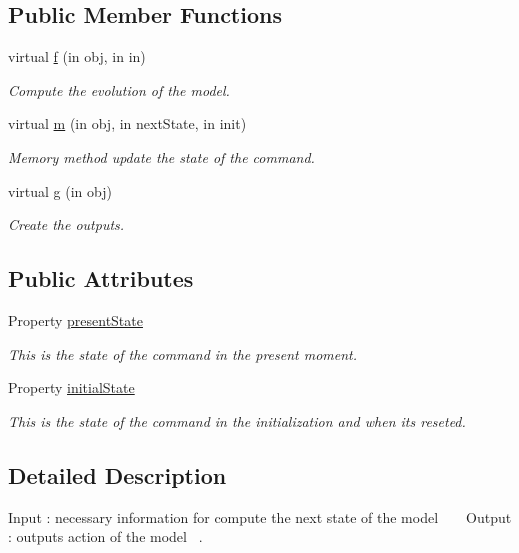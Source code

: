 \subsection*{Public Member Functions}
\begin{DoxyCompactItemize}
\item 
virtual \hyperlink{class_model_s_e_d_ac36f9451c43b120828af4380858f2024}{f} (in obj, in in)
\begin{DoxyCompactList}\small\item\em Compute the evolution of the model. \end{DoxyCompactList}\item 
virtual \hyperlink{class_model_s_e_d_adb8aaccb857cf5bbec640cd00915459d}{m} (in obj, in next\+State, in init)
\begin{DoxyCompactList}\small\item\em Memory method update the state of the command. \end{DoxyCompactList}\item 
virtual \hyperlink{class_model_s_e_d_ac6bf71081e35755d5ed9992d165afcb8}{g} (in obj)
\begin{DoxyCompactList}\small\item\em Create the outputs. \end{DoxyCompactList}\end{DoxyCompactItemize}
\subsection*{Public Attributes}
\begin{DoxyCompactItemize}
\item 
Property \hyperlink{class_model_s_e_d_a9624cc7c421a50fa5086b0ebd0cd5fe3}{present\+State}
\begin{DoxyCompactList}\small\item\em This is the state of the command in the present moment. \end{DoxyCompactList}\item 
Property \hyperlink{class_model_s_e_d_acd9263acfa96c9138afdf497e55acc24}{initial\+State}
\begin{DoxyCompactList}\small\item\em This is the state of the command in the initialization and when it\textquotesingle{}s reseted. \end{DoxyCompactList}\end{DoxyCompactItemize}


\subsection{Detailed Description}
Input \+: necessary information for compute the next state of the model ~\newline
~\newline
Output \+: output\textquotesingle{}s action of the model~\newline
. 

